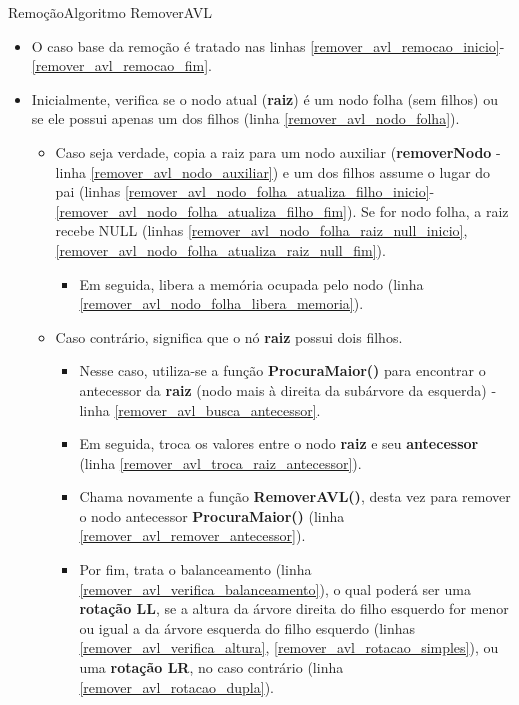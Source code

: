 \documentclass[aspectratio=169]{beamer}
\begin{document}
\begin{frame}{Remoção}{Algoritmo RemoverAVL}
\begin{itemize}
\item O caso base da remoção é tratado nas linhas  \ref{remover_avl_remocao_inicio}-\ref{remover_avl_remocao_fim}.
\item Inicialmente, verifica se o nodo atual ({\bf raiz}) é um nodo folha (sem filhos) ou se ele possui apenas um dos filhos (linha \ref{remover_avl_nodo_folha}).
\begin{itemize}
\item Caso seja verdade, copia a raiz para um nodo auxiliar ({\bf removerNodo} - linha \ref{remover_avl_nodo_auxiliar}) e um dos filhos assume o lugar do pai (linhas \ref{remover_avl_nodo_folha_atualiza_filho_inicio}-\ref{remover_avl_nodo_folha_atualiza_filho_fim}). Se for nodo folha, a raiz recebe NULL (linhas \ref{remover_avl_nodo_folha_raiz_null_inicio}, \ref{remover_avl_nodo_folha_atualiza_raiz_null_fim}).
\begin{itemize}
\item Em seguida, libera a memória ocupada pelo nodo (linha \ref{remover_avl_nodo_folha_libera_memoria}).
\end{itemize}
\item Caso contrário, significa que o nó {\bf raiz} possui dois filhos. 
\begin{itemize}
\item Nesse caso, utiliza-se a função {\bf ProcuraMaior()} para encontrar o antecessor da {\bf raiz} (nodo mais à direita da subárvore da esquerda) - linha \ref{remover_avl_busca_antecessor}.
\item Em seguida, troca os valores entre o nodo {\bf raiz} e seu {\bf antecessor} (linha \ref{remover_avl_troca_raiz_antecessor}).
\item Chama novamente a função {\bf RemoverAVL()}, desta vez para remover o nodo antecessor {\bf ProcuraMaior()} (linha \ref{remover_avl_remover_antecessor}).
\item Por fim, trata o balanceamento (linha \ref{remover_avl_verifica_balanceamento}), o qual poderá ser uma {\bf rotação LL}, se a altura da árvore direita do filho esquerdo for menor ou igual a da árvore esquerda do filho esquerdo (linhas \ref{remover_avl_verifica_altura}, \ref{remover_avl_rotacao_simples}), ou uma {\bf rotação LR}, no caso contrário (linha \ref{remover_avl_rotacao_dupla}).
\end{itemize}
\end{itemize}
\end{itemize}
\end{frame}
\end{document}
